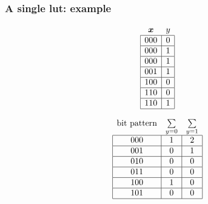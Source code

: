 \documentclass[pdflatex,compress]{beamer}
\begin{document}
\begin{frame}
	\frametitle{A single lut: example}
	\small
		\begin{minipage}{.95\linewidth}\centering
			\begin{minipage}[b]{.2\linewidth}\centering
				\begin{align*}
					\begin{array}{cc}
						\bm{x}                         & y                      \\ \hline
						\multicolumn{1}{|c|}{000} & \multicolumn{1}{c|}{0} \\ \hline
						\multicolumn{1}{|c|}{000} & \multicolumn{1}{c|}{1} \\ \hline
						\multicolumn{1}{|c|}{000} & \multicolumn{1}{c|}{1} \\ \hline
						\multicolumn{1}{|c|}{001} & \multicolumn{1}{c|}{1} \\ \hline
						\multicolumn{1}{|c|}{100} & \multicolumn{1}{c|}{0} \\ \hline
						\multicolumn{1}{|c|}{110} & \multicolumn{1}{c|}{0} \\ \hline
						\multicolumn{1}{|c|}{110} & \multicolumn{1}{c|}{1} \\ \hline
					\end{array}
				\end{align*}
			\end{minipage}
			\begin{minipage}[b]{.4\linewidth}\centering
				\begin{align*}
					\begin{array}{ccc}
						\text{bit pattern}        & \sum\limits_{y=0}      & \multicolumn{1}{l}{\sum\limits_{y=1}} \\ \hline
						\multicolumn{1}{|c|}{000} & \multicolumn{1}{c|}{1} & \multicolumn{1}{c|}{2}                \\ \hline
						\multicolumn{1}{|c|}{001} & \multicolumn{1}{c|}{0} & \multicolumn{1}{c|}{1}                \\ \hline
						\multicolumn{1}{|c|}{010} & \multicolumn{1}{c|}{0} & \multicolumn{1}{c|}{0}                \\ \hline
						\multicolumn{1}{|c|}{011} & \multicolumn{1}{c|}{0} & \multicolumn{1}{c|}{0}                \\ \hline
						\multicolumn{1}{|c|}{100} & \multicolumn{1}{c|}{1} & \multicolumn{1}{c|}{0}                \\ \hline
						\multicolumn{1}{|c|}{101} & \multicolumn{1}{c|}{0} & \multicolumn{1}{c|}{0}                \\ \hline

\end{array}
\end{align*}
\end{minipage}
\end{minipage}
\end{frame}
\end{document}

